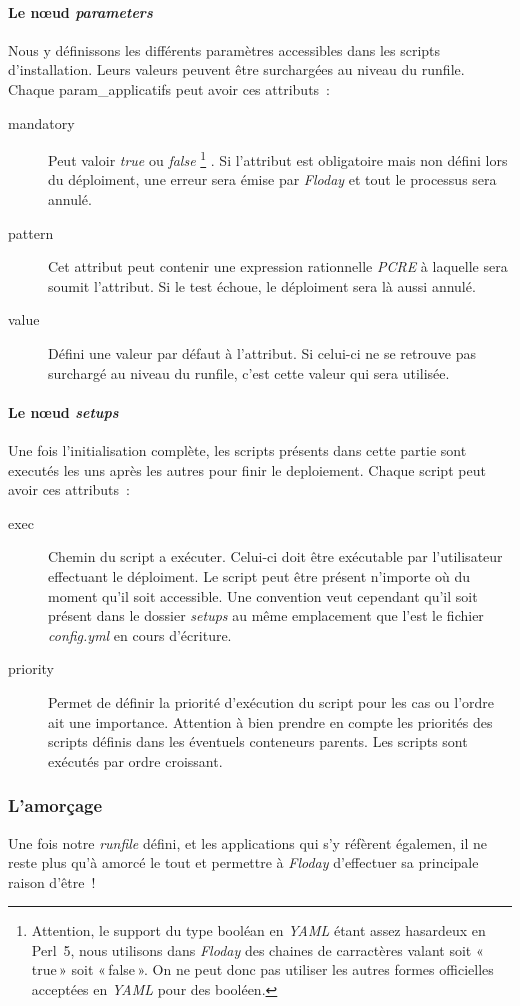 \paragraph{Le nœud \emph{parameters}}
Nous y définissons les différents paramètres accessibles dans les scripts d'installation. Leurs valeurs peuvent être surchargées au niveau du \gls{runfile}.
Chaque \gls{param_applicatifs} peut avoir ces attributs~:
\begin{description}
	\item[mandatory] Peut valoir \emph{true} ou \emph{false}%
		\footnote{Attention, le support du type booléan en \emph{YAML} étant assez hasardeux en Perl~5, nous utilisons dans \emph{Floday} des chaines de carractères valant soit «\,true\,» soit «\,false\,». On ne peut donc pas utiliser les autres formes officielles acceptées en \emph{YAML} pour des booléen.}%
		. Si l'attribut est obligatoire mais non défini lors du déploiment, une erreur sera émise par \emph{Floday} et tout le processus sera annulé.
	\item[pattern] Cet attribut peut contenir une expression rationnelle \emph{PCRE} à laquelle sera soumit l'attribut. Si le test échoue, le déploiment sera là aussi annulé.
	\item[value] Défini une valeur par défaut à l'attribut. Si celui-ci ne se retrouve pas surchargé au niveau du \gls{runfile}, c'est cette valeur qui sera utilisée.
\end{description}

\paragraph{Le nœud \emph{setups}}
Une fois l'\gls{initialisation} complète, les scripts présents dans cette partie sont executés les uns après les autres pour finir le \gls{deploiement}.
Chaque script peut avoir ces attributs~:
\begin{description}
	\item[exec] Chemin du script a exécuter. Celui-ci doit être exécutable par l'utilisateur effectuant le déploiment. Le script peut être présent n'importe où du moment qu'il soit accessible. Une convention veut cependant qu'il soit présent dans le dossier \emph{setups} au même emplacement que l'est le fichier \emph{config.yml} en cours d'écriture.
	\item[priority] Permet de définir la priorité d'exécution du script pour les cas ou l'ordre ait une importance. Attention à bien prendre en compte les priorités des scripts définis dans les éventuels conteneurs parents. Les scripts sont exécutés par ordre croissant.
\end{description}

\subsubsection{L'amorçage}

Une fois notre \emph{runfile} défini, et les applications qui s'y réfèrent égalemen, il ne reste plus qu'à amorcé le tout et permettre à \emph{Floday} d'effectuer sa principale raison d'être~!
